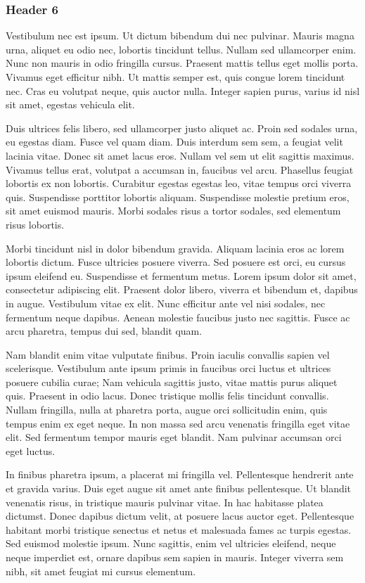 \documentclass{article}
\begin{document}
\subsubsection{Header 6}\label{H2507771}



Vestibulum nec est ipsum. Ut dictum bibendum dui nec pulvinar. Mauris magna urna, aliquet eu odio nec, lobortis tincidunt tellus. Nullam sed ullamcorper enim. Nunc non mauris in odio fringilla cursus. Praesent mattis tellus eget mollis porta. Vivamus eget efficitur nibh. Ut mattis semper est, quis congue lorem tincidunt nec. Cras eu volutpat neque, quis auctor nulla. Integer sapien purus, varius id nisl sit amet, egestas vehicula elit.


Duis ultrices felis libero, sed ullamcorper justo aliquet ac. Proin sed sodales urna, eu egestas diam. Fusce vel quam diam. Duis interdum sem sem, a feugiat velit lacinia vitae. Donec sit amet lacus eros. Nullam vel sem ut elit sagittis maximus. Vivamus tellus erat, volutpat a accumsan in, faucibus vel arcu. Phasellus feugiat lobortis ex non lobortis. Curabitur egestas egestas leo, vitae tempus orci viverra quis. Suspendisse porttitor lobortis aliquam. Suspendisse molestie pretium eros, sit amet euismod mauris. Morbi sodales risus a tortor sodales, sed elementum risus lobortis.


Morbi tincidunt nisl in dolor bibendum gravida. Aliquam lacinia eros ac lorem lobortis dictum. Fusce ultricies posuere viverra. Sed posuere est orci, eu cursus ipsum eleifend eu. Suspendisse et fermentum metus. Lorem ipsum dolor sit amet, consectetur adipiscing elit. Praesent dolor libero, viverra et bibendum et, dapibus in augue. Vestibulum vitae ex elit. Nunc efficitur ante vel nisi sodales, nec fermentum neque dapibus. Aenean molestie faucibus justo nec sagittis. Fusce ac arcu pharetra, tempus dui sed, blandit quam.


Nam blandit enim vitae vulputate finibus. Proin iaculis convallis sapien vel scelerisque. Vestibulum ante ipsum primis in faucibus orci luctus et ultrices posuere cubilia curae; Nam vehicula sagittis justo, vitae mattis purus aliquet quis. Praesent in odio lacus. Donec tristique mollis felis tincidunt convallis. Nullam fringilla, nulla at pharetra porta, augue orci sollicitudin enim, quis tempus enim ex eget neque. In non massa sed arcu venenatis fringilla eget vitae elit. Sed fermentum tempor mauris eget blandit. Nam pulvinar accumsan orci eget luctus.


In finibus pharetra ipsum, a placerat mi fringilla vel. Pellentesque hendrerit ante et gravida varius. Duis eget augue sit amet ante finibus pellentesque. Ut blandit venenatis risus, in tristique mauris pulvinar vitae. In hac habitasse platea dictumst. Donec dapibus dictum velit, at posuere lacus auctor eget. Pellentesque habitant morbi tristique senectus et netus et malesuada fames ac turpis egestas. Sed euismod molestie ipsum. Nunc sagittis, enim vel ultricies eleifend, neque neque imperdiet est, ornare dapibus sem sapien in mauris. Integer viverra sem nibh, sit amet feugiat mi cursus elementum.





\printbibliography[title={Bibliography}]
\end{document}
